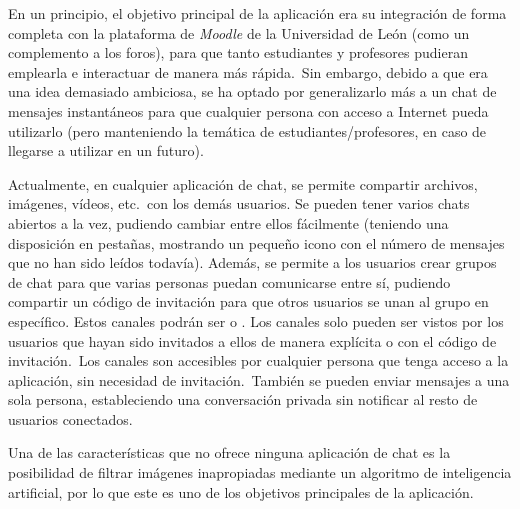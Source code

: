 En un principio, el objetivo principal de la aplicación era su integración de forma completa con la plataforma de
\textit{Moodle} de la Universidad de León (como un complemento a los foros), para que tanto estudiantes y profesores
pudieran emplearla e interactuar de manera más rápida.\ Sin embargo, debido a que era una idea demasiado ambiciosa,
se ha optado por generalizarlo más a un chat de mensajes instantáneos para que cualquier persona con acceso a
Internet pueda utilizarlo (pero manteniendo la temática de estudiantes/profesores, en caso de llegarse a utilizar en
un futuro).

Actualmente, en cualquier aplicación de chat, se permite compartir archivos, imágenes, vídeos, etc.\ con los demás
usuarios.
Se pueden tener varios chats abiertos a la vez, pudiendo cambiar entre ellos fácilmente (teniendo una disposición en
pestañas, mostrando un pequeño icono con el número de mensajes que no han sido leídos todavía).
Además, se permite a los usuarios crear grupos de chat para que varias personas puedan
comunicarse entre sí, pudiendo compartir un código de invitación para que otros usuarios se unan al grupo en específico.
Estos canales podrán ser  o .
Los canales  solo pueden ser vistos por los usuarios que hayan sido invitados a ellos de manera
explícita o con el código de invitación.\ Los canales  son accesibles por cualquier persona que
tenga acceso a la aplicación, sin necesidad de invitación.\ También se pueden enviar mensajes a una sola persona,
estableciendo una conversación privada sin notificar al resto de usuarios conectados.

Una de las características que no ofrece ninguna aplicación de chat es la posibilidad de filtrar imágenes inapropiadas
mediante un algoritmo de inteligencia artificial, por lo que este es uno de los objetivos principales de la aplicación.
